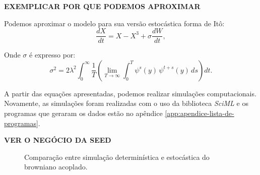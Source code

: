 \textbf{EXEMPLICAR POR QUE PODEMOS APROXIMAR}

Podemos aproximar o modelo para sua versão estocástica forma de Itô:
\begin{equation}
    \frac{dX}{dt} = X - X^{3} + \sigma \frac{dW}{dt},
\end{equation}

Onde $\sigma$ é expresso por:
\begin{equation}
    \sigma^{2} = 2 \lambda^{2} \int_{0}^{\infty} \frac{1}{T}  \left( \lim_{T \to \infty} \int_{0}^{T} \psi^{s}(y)\, \psi^{t+s}(y)\, ds \right) dt.
\end{equation}

A partir das equações apresentadas, podemos realizar simulações computacionais. Novamente, as simulações foram realizadas com o uso da biblioteca \textit{SciML} \citep{Rackauckas2017} e os programas que geraram os dados estão no apêndice \ref{app:apendice-lista-de-programas}. 

\textbf{VER O NEGÓCIO DA SEED}

\begin{figure}[H]
    \centering
    \hfill
    \caption{Comparação entre simulação determinística e estocástica do browniano acoplado.}
    \label{fig:ch02-exemplo-comparacao-simulacao}
\end{figure}

